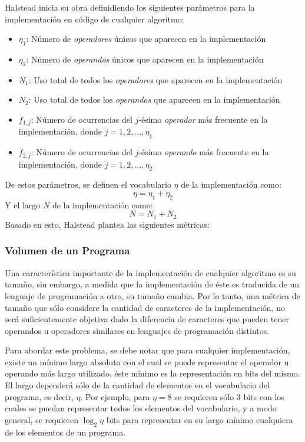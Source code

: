 \documentclass[letterpaper,12pt]{article}
\begin{document}
Halstead inicia su obra definidiendo los siguientes parámetros para la implementación en código de cualquier algoritmo:

\begin{itemize}
  \item $\eta_{1}$: Número de \textit{operadores} únicos que aparecen en la implementación
  \item $\eta_{2}$: Número de \textit{operandos} únicos que aparecen en la implementación
  \item $N_{1}$: Uso total de todos los \textit{operadores} que aparecen en la implementación
  \item $N_{2}$: Uso total de todos los \textit{operandos} que aparecen en la implementación
  \item $f_{1,j}$: Número de ocurrencias del $j$-ésimo \textit{operador} más frecuente en la implementación, donde $j = 1, 2, ..., \eta_{1}$
  \item $f_{2,j}$: Número de ocurrencias del $j$-ésimo \textit{operando} más frecuente en la implementación, donde $j = 1, 2, ..., \eta_{2}$
\end{itemize}

De estos parámetros, se definen el vocabulario $\eta$ de la implementación como:
\begin{equation*}
  \eta = \eta_{1} + \eta_{2}
\end{equation*}
Y el largo $N$ de la implementación como:
\begin{equation*}
  N = N_{1} + N_{2}
\end{equation*}
Basado en esto, Halstead plantea las siguientes métricas:

\subsubsection{Volumen de un Programa}

Una característica importante de la implementación de cualquier algoritmo es su tamaño, sin embargo, a medida que la implementación de éste es traducida de un lenguaje de programación a otro, su tamaño cambia. Por lo tanto, una métrica de tamaño que sólo considere la cantidad de caracteres de la implementación, no será suficientemente objetiva dado la diferencia de caracteres que pueden tener operandos u operadores similares en lenguajes de programación distintos.

Para abordar este problema, se debe notar que para cualquier implementación, existe un mínimo largo absoluto con el cual se puede representar el operador u operando más largo utilizado, éste mínimo es la representación en bits del mismo. El largo dependerá sólo de la cantidad de elementos en el vocabulacio del programa, es decir, $\eta$. Por ejemplo, para $\eta = 8$ se requieren sólo 3 bits con los cuales se puedan representar todos los elementos del vocabulario, y a modo general, se requieren $\log_{2}\eta$ bits para representar en su largo mínimo cualquiera de los elementos de un programa.
\end{document}
